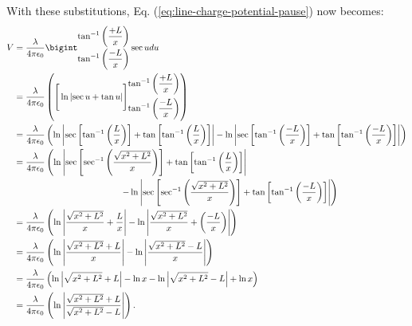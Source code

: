 \documentclass[12pt,b4paper]{article}
\begin{document}
With these substitutions, Eq. (\ref{eq:line-charge-potential-pause}) now becomes:
\begin{align}
    V&=\frac{\lambda}{4\pi\epsilon_0}\bigint_{\displaystyle\tan^{-1}\left(\frac{-L}{x}\right)}^{\displaystyle\tan^{-1}\left(\frac{+L}{x}\right)}\sec{u}du\notag\\
    &=\frac{\lambda}{4\pi\epsilon_0}\left(\Bigg[\ln{\left|\sec{u}+\tan{u}\right|}\Bigg]_{\displaystyle\tan^{-1}\left(\frac{-L}{x}\right)}^{\displaystyle\tan^{-1}\left(\frac{+L}{x}\right)}\right)\notag\\
    &=\frac{\lambda}{4\pi\epsilon_0}\left(\ln\left|\sec{\left[\tan^{-1}\left(\frac{L}{x}\right)\right]}+\tan{\left[\tan^{-1}\left(\frac{L}{x}\right)\right]}\right|-\ln\left|\sec{\left[\tan^{-1}\left(\frac{-L}{x}\right)\right]}+\tan{\left[\tan^{-1}\left(\frac{-L}{x}\right)\right]}\right|\right)\notag\\
    &=\frac{\lambda}{4\pi\epsilon_0}\left(\ln\left|\sec{\left[\sec^{-1}\left(\frac{\sqrt{x^2+L^2}}{x}\right)\right]}+\tan{\left[\tan^{-1}\left(\frac{L}{x}\right)\right]}\right|\right.\notag\\
    &\left.\hspace{120pt}-\ln\left|\sec{\left[\sec^{-1}\left(\frac{\sqrt{x^2+L^2}}{x}\right)\right]}+\tan{\left[\tan^{-1}\left(\frac{-L}{x}\right)\right]}\right|\right)\notag\\
    &=\frac{\lambda}{4\pi\epsilon_0}\left(\ln\left|\frac{\sqrt{x^2+L^2}}{x}+\frac{L}{x}\right|-\ln\left|\frac{\sqrt{x^2+L^2}}{x}+\left(\frac{-L}{x}\right)\right|\right)\notag\\
    &=\frac{\lambda}{4\pi\epsilon_0}\left(\ln\left|\frac{\sqrt{x^2+L^2}+L}{x}\right|-\ln\left|\frac{\sqrt{x^2+L^2}-L}{x}\right|\right)\notag\\
    &=\frac{\lambda}{4\pi\epsilon_0}\left(\ln{\left|\sqrt{x^2+L^2}+L\right|}-\ln{x}-\ln{\left|\sqrt{x^2+L^2}-L\right|}+\ln{x}\right)\notag\\
    &=\frac{\lambda}{4\pi\epsilon_0}\left(\ln\left|{\frac{\sqrt{x^2+L^2}+L}{\sqrt{x^2+L^2}-L}}\right|\right).
\end{align}
\end{document}
